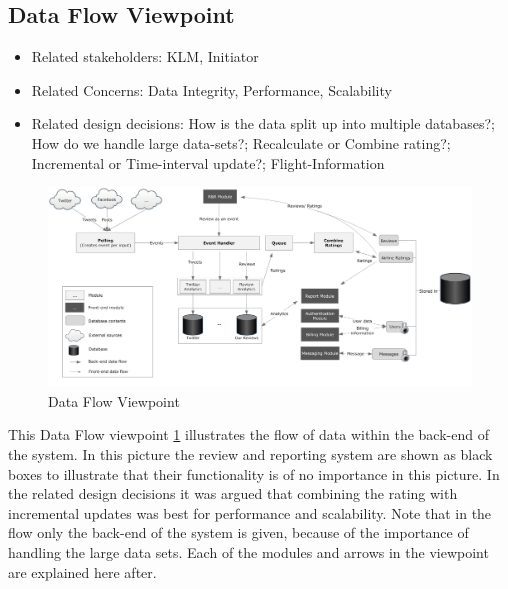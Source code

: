 % 

\subsection{Data Flow Viewpoint}

\begin{itemize}
\item Related stakeholders: KLM, Initiator
\item Related Concerns: Data Integrity, Performance, Scalability
\item Related design decisions: How is the data split up into multiple databases?; How do we handle large data-sets?; Recalculate or Combine rating?; Incremental or Time-interval update?; Flight-Information
\end{itemize}

\newpage
\begin{landscape}
\begin{figure}
\includegraphics[width=600px]{DataFloow}
\caption{Data Flow Viewpoint}
\label{fig:Data Flow}
\end{figure}
\end{landscape}

This Data Flow viewpoint \ref{fig:Data Flow} illustrates the flow of data within the back-end of the system. In this picture the review and reporting system are shown as black boxes to illustrate that their functionality is of no importance in this picture.
In the related design decisions it was argued that combining the rating with incremental updates was best for performance and scalability. Note that in the flow only the back-end of the system is given, because of the importance of handling the large data sets. Each of the modules and arrows in the viewpoint are explained here after.

